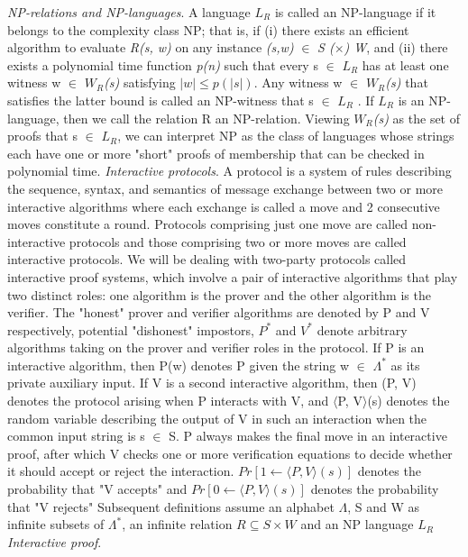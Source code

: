 \documentclass[a4paper]{article}
\begin{document}
\newline
\textit{NP-relations and NP-languages}. A language \textit{$L_R$} is called an NP-language if it belongs to the complexity class NP; that is, if (i) there exists an efficient algorithm to evaluate \textit{R(s, w)} on any instance \textit{(s,w)} $\in$ \textit{S ($\times$) W}, and (ii) there exists a polynomial time function \emph{p(n)} such that every s $\in$ \textit{$L_R$} has at least one witness w $\in$ \textit{$W_R$(s)} satisfying $|w|\leq p(|s|)$.
Any witness w $\in$ \textit{$W_R$(s)} that satisfies the latter bound is called an NP-witness that s $\in$ \textit{$L_R$} . If \textit{$L_R$} is an NP-language, then we call the relation R an NP-relation. Viewing \textit{$W_R$(s)} as the set of proofs that s $\in$ \textit{$L_R$}, we can interpret NP as the class of languages whose strings each have one or more "short" proofs of membership that can be checked in polynomial time.
\newline
\newline
\textit{Interactive protocols}. A protocol is a system of rules describing the sequence, syntax, and semantics of message exchange between two or more interactive algorithms where each exchange is called a move and 2 consecutive moves constitute a round. Protocols comprising just one move are called non-interactive protocols and those comprising two or more moves are called interactive protocols. We will be dealing with two-party protocols called interactive proof systems, which involve a pair of interactive algorithms that play two distinct roles: one algorithm is the prover and the other algorithm is the verifier. The "honest" prover and verifier algorithms are denoted by P and V respectively, potential "dishonest" impostors, \textit{$P^{*}$} and \textit{$V^{*}$} denote arbitrary algorithms taking on the prover and verifier roles in the protocol. If P is an interactive algorithm, then P(w) denotes P given the string w $\in$ \(\Lambda^{*}\) as its private auxiliary input. If V is a second interactive algorithm, then (P, V) denotes the protocol arising when P interacts with V, and $\langle$P, V$\rangle$(s) denotes the random variable describing the output of V in such an interaction when the common input string is s $\in$ S. P always makes the final move in an interactive proof, after which V checks one or more verification equations to decide whether it should accept or reject the interaction. $Pr[1 \gets \langle P, V \rangle (s)]$ denotes the probability that "V accepts" and $Pr[0 \gets \langle P, V \rangle (s)]$ denotes the probability that "V rejects"
\newline
Subsequent definitions assume an alphabet \(\Lambda\), S and W as infinite subsets of \(\Lambda^{*}\), an infinite relation $R \subseteq S \times W$ and an NP language \textit{$L_R$} 
\newline
\newline
\textit{Interactive proof}. 
\newline
\end{document}
